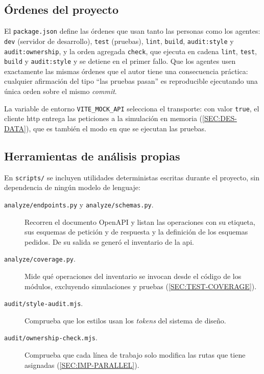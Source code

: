 \subsection{Órdenes del proyecto}

El \texttt{package.json} define las órdenes que usan tanto las personas como los agentes:
\texttt{dev} (servidor de desarrollo), \texttt{test} (pruebas), \texttt{lint},
\texttt{build}, \texttt{audit:style} y \texttt{audit:ownership}, y la orden agregada
\texttt{check}, que ejecuta en cadena \texttt{lint}, \texttt{test}, \texttt{build} y
\texttt{audit:style} y se detiene en el primer fallo. Que los agentes usen exactamente las
mismas órdenes que el autor tiene una consecuencia práctica: cualquier afirmación del tipo
``las pruebas pasan'' es reproducible ejecutando una única orden sobre el mismo
\textit{commit}.

La variable de entorno \texttt{VITE\_MOCK\_API} selecciona el transporte: con valor
\texttt{true}, el cliente \acs{http} entrega las peticiones a la simulación en memoria
(\cref{SEC:DES-DATA}), que es también el modo en que se ejecutan las pruebas.

\subsection{Herramientas de análisis propias}

En \texttt{scripts/} se incluyen utilidades deterministas escritas durante el proyecto, sin
dependencia de ningún modelo de lenguaje:
\begin{description}
  \item[\texttt{analyze/endpoints.py} y \texttt{analyze/schemas.py}.] Recorren el documento
        OpenAPI y listan las operaciones con su etiqueta, sus esquemas de petición y de
        respuesta y la definición de los esquemas pedidos. De su salida se generó el
        inventario de la \acs{api}.
  \item[\texttt{analyze/coverage.py}.] Mide qué operaciones del inventario se invocan desde
        el código de los módulos, excluyendo simulaciones y pruebas (\cref{SEC:TEST-COVERAGE}).
  \item[\texttt{audit/style-audit.mjs}.] Comprueba que los estilos usan los
        \textit{tokens} del sistema de diseño.
  \item[\texttt{audit/ownership-check.mjs}.] Comprueba que cada línea de trabajo solo
        modifica las rutas que tiene asignadas (\cref{SEC:IMP-PARALLEL}).
\end{description}


